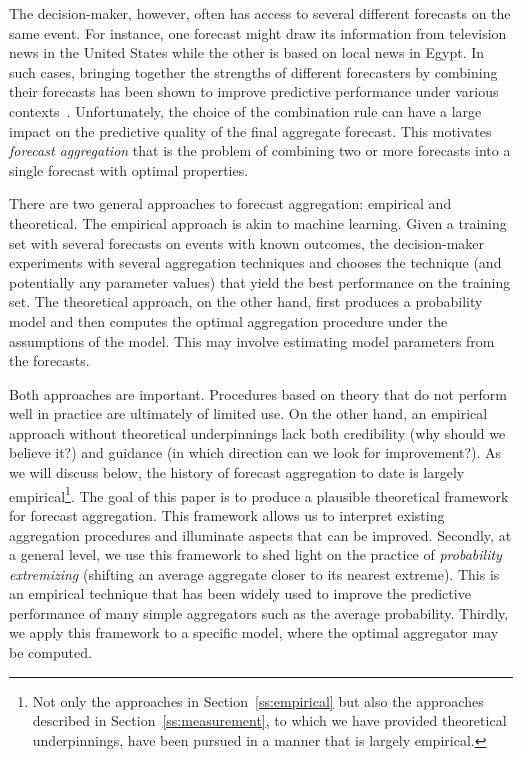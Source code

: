 \documentclass[11pt]{article}
\theoremstyle{definition}
\theoremstyle{definition}
\begin{document}
The decision-maker, however, often has access to several different
forecasts on the same event. For instance, one forecast might draw its
information from television news in the United States while the other
is based on local news in Egypt. In such cases, bringing together the
strengths of different forecasters by combining their forecasts has
been shown to improve predictive performance under various
contexts~\citep{clemen1989combining,
armstrong2001combining}. Unfortunately, the choice of the combination
rule can have a large impact on the predictive quality of the final
aggregate forecast.  
This motivates \textit{forecast aggregation} that
is the problem of combining two or more forecasts into a single
forecast with optimal properties.

There are two general approaches to forecast aggregation: empirical
and theoretical.  The empirical approach is akin to machine
learning. Given a training set with several forecasts on events with
known outcomes, the decision-maker experiments with several
aggregation techniques and chooses the technique (and potentially any
parameter values) that yield the best performance on the training set.
The theoretical approach, on the other hand, first produces a
probability model and then computes the optimal aggregation procedure
under the assumptions of the model.  This may involve estimating model
parameters from the forecasts.

Both approaches are important.  Procedures based on theory that do not
perform well in practice are ultimately of limited use.  On the other
hand, an empirical approach without theoretical underpinnings lack
both credibility (why should we believe it?)  and guidance (in which
direction can we look for improvement?).  As we will discuss below,
the history of forecast aggregation to date is largely
empirical\footnote{Not only the approaches in
Section~\ref{ss:empirical} but also the approaches described in
Section~\ref{ss:measurement}, to which we have provided theoretical
underpinnings, have been pursued in a manner that is largely
empirical.}.  The goal of this paper is to produce a plausible
theoretical framework for forecast aggregation.  This framework allows
us to interpret existing aggregation procedures and illuminate aspects
that can be improved.  Secondly, at a general level, we use this
framework to shed light on the practice of {\em probability
extremizing} (shifting an average aggregate closer to its nearest
extreme). This is an empirical technique that has been widely used to
improve the predictive performance of many simple aggregators such as
the average probability. Thirdly, we apply this framework to a
specific model, where the optimal aggregator may be computed.
\end{document}
